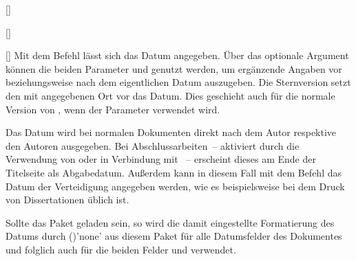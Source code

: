 \begin{Declaration*}{}
\begin{Declaration*}{}
\begin{Declaration*}{}
\begin{Declaration}{[]}
\begin{Declaration}[v2.05]{%
  []%
}
\begin{Declaration}[v2.05]{%
}
\begin{Declaration}[v2.05]{%
}
\begin{Declaration}[v2.05]{%
}
\begin{Declaration}{[]}
\printdeclarationlist%
%
%
%
%
Mit dem Befehl  lässt sich das Datum angegeben. 
Über das optionale Argument können die beiden Parameter 
 und  genutzt werden, um 
ergänzende Angaben vor beziehungsweise nach dem eigentlichen Datum auszugeben. 
Die Sternversion  setzt den mit  angegebenen Ort vor 
das Datum. Dies geschieht auch für die normale Version von , wenn 
der Parameter  verwendet wird.

Das Datum wird bei normalen Dokumenten direkt nach dem Autor respektive den 
Autoren ausgegeben. Bei Abschlussarbeiten~-- aktiviert durch die Verwendung von 
 oder  in Verbindung mit ~-- 
erscheint dieses am Ende der Titelseite als Abgabedatum. Außerdem kann in 
diesem Fall mit dem Befehl das Datum der Verteidigung 
angegeben werden, wie es beispielsweise bei dem Druck von Dissertationen üblich 
ist.

Sollte das Paket  geladen sein, so wird die damit eingestellte 
Formatierung des Datums durch ()'none' aus 
diesem Paket für alle Datumsfelder des Dokumentes und folglich auch für die 
beiden Felder  und  verwendet.
\end{Declaration}
\end{Declaration}
\end{Declaration}
\end{Declaration}
\end{Declaration}
\end{Declaration}


\end{Declaration*}
\end{Declaration*}
\end{Declaration*}
